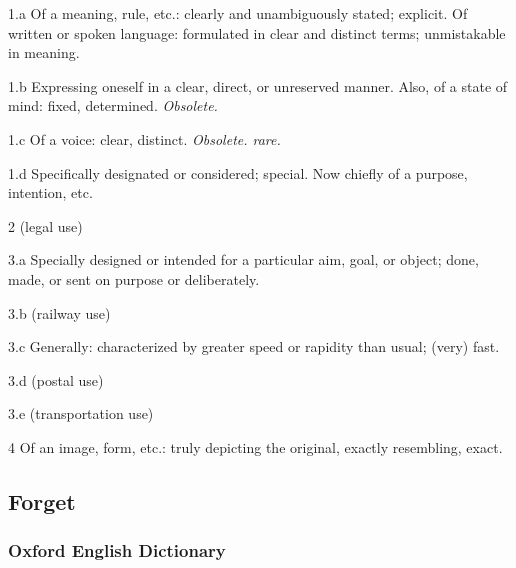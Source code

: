 			\begin{compactitem}
				\item[1.a] Of a meaning, rule, etc.: clearly and unambiguously stated; explicit. Of written or spoken language: formulated in clear and distinct terms; unmistakable in meaning.
				\item[1.b] Expressing oneself in a clear, direct, or unreserved manner. Also, of a state of mind: fixed, determined. \textit{Obsolete.}
				\item[1.c] Of a voice: clear, distinct. \textit{Obsolete. rare.}
				\item[1.d] Specifically designated or considered; special. Now chiefly of a purpose, intention, etc.
				\item[2] (legal use)
				\item[3.a] Specially designed or intended for a particular aim, goal, or object; done, made, or sent on purpose or deliberately.
				\item[3.b] (railway use)
				\item[3.c] Generally: characterized by greater speed or rapidity than usual; (very) fast.
				\item[3.d] (postal use)
				\item[3.e] (transportation use)
				\item[4] Of an image, form, etc.: truly depicting the original, exactly resembling, exact.
			\end{compactitem}


	\subsection{Forget} %
		\label{FORGET}
		
		\subsubsection{Oxford English Dictionary}
		
